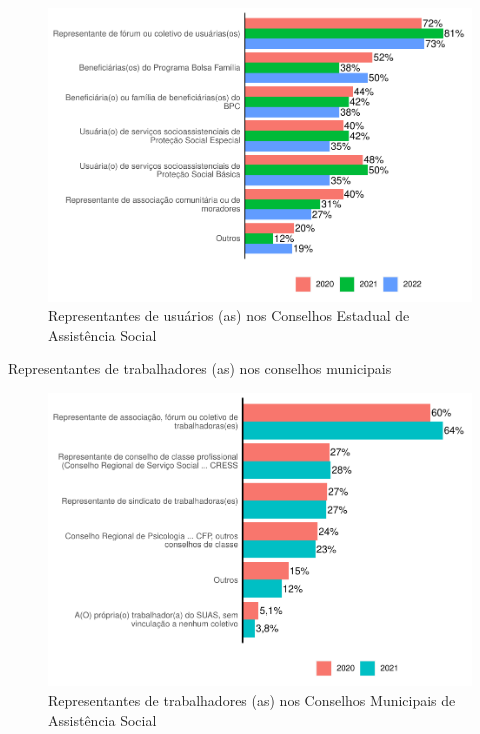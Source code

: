 \documentclass[
  brazilian]{report}
\begin{document}
\begin{figure}
\includegraphics{Censo-SUAS-2022_files/figure-latex/usu_ceas-1} \caption[Representantes de usuários (as) nos Conselhos Estadual de Assistência Social]{Representantes de usuários (as) nos Conselhos Estadual de Assistência Social}\label{fig:usu_ceas}
\end{figure}

Representantes de trabalhadores (as) nos conselhos municipais

\begin{figure}
\includegraphics{Censo-SUAS-2022_files/figure-latex/trab_cmun-1} \caption[Representantes de trabalhadores (as) nos Conselhos Municipais de Assistência Social]{Representantes de trabalhadores (as) nos Conselhos Municipais de Assistência Social}\label{fig:trab_cmun}
\end{figure}
\end{document}
